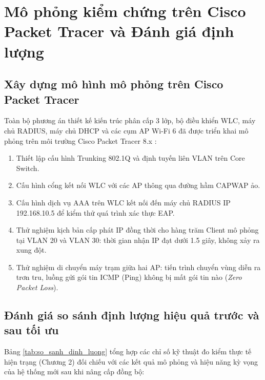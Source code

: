 \section{Mô phỏng kiểm chứng trên Cisco Packet Tracer và Đánh giá định lượng}

\subsection{Xây dựng mô hình mô phỏng trên Cisco Packet Tracer}

Toàn bộ phương án thiết kế kiến trúc phân cấp 3 lớp, bộ điều khiển WLC, máy chủ RADIUS, máy chủ DHCP và các cụm AP Wi-Fi 6 đã được triển khai mô phỏng trên môi trường Cisco Packet Tracer 8.x \cite{cisco2023packettracer}:
\begin{enumerate}
    \item Thiết lập cấu hình Trunking 802.1Q và định tuyến liên VLAN trên Core Switch.
    \item Cấu hình cổng kết nối WLC với các AP thông qua đường hầm CAPWAP ảo.
    \item Cấu hình dịch vụ AAA trên WLC kết nối đến máy chủ RADIUS IP 192.168.10.5 để kiểm thử quá trình xác thực EAP.
    \item Thử nghiệm kịch bản cấp phát IP đồng thời cho hàng trăm Client mô phỏng tại VLAN 20 và VLAN 30: thời gian nhận IP đạt dưới 1.5 giây, không xảy ra xung đột.
    \item Thử nghiệm di chuyển máy trạm giữa hai AP: tiến trình chuyển vùng diễn ra trơn tru, luồng gửi gói tin ICMP (Ping) không bị mất gói tin nào (\textit{Zero Packet Loss}).
\end{enumerate}

\subsection{Đánh giá so sánh định lượng hiệu quả trước và sau tối ưu}

Bảng \ref{tab:so_sanh_dinh_luong} tổng hợp các chỉ số kỹ thuật đo kiểm thực tế hiện trạng (Chương 2) đối chiếu với các kết quả mô phỏng và hiệu năng kỳ vọng của hệ thống mới sau khi nâng cấp đồng bộ:

